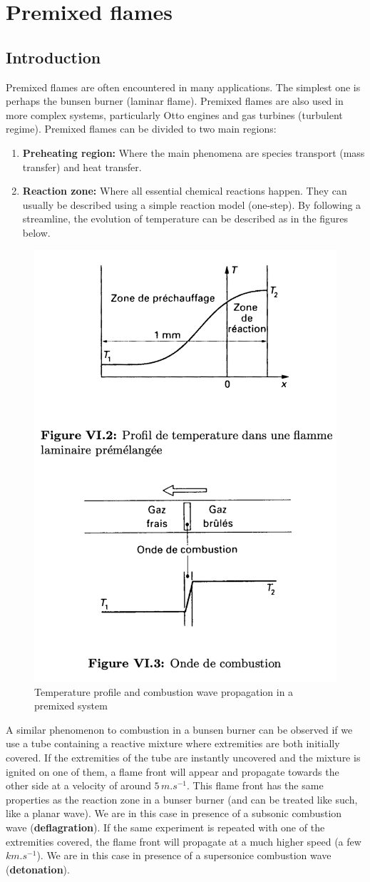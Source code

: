 \documentclass[a4paper,11pt]{article}
\begin{document}
\section{Premixed flames}
\subsection{Introduction}
Premixed flames are often encountered in many applications. The simplest one is perhaps the bunsen burner (laminar flame). Premixed flames are also used in more complex systems, particularly Otto engines and gas turbines (turbulent regime). Premixed flames can be divided to two main regions:
\begin{enumerate}
	\item \textbf{Preheating region:} Where the main phenomena are species transport (mass transfer) and heat transfer.
	\item \textbf{Reaction zone:} Where all essential chemical reactions happen. They can usually be described using a simple reaction model (one-step). By following a streamline, the evolution of temperature can be described as in the figures below.
\end{enumerate}
\begin{figure}[h]
	\centering
	\includegraphics[width=.49\linewidth]{figures/prmx.png}
	\caption{Temperature profile and combustion wave propagation in a premixed system}
\end{figure}
A similar phenomenon to combustion in a bunsen burner can be observed if we use a tube containing a reactive mixture where extremities are both initially covered. If the extremities of the tube are instantly uncovered and the mixture is ignited on one of them, a flame front will appear and propagate towards the other side at a velocity of around $5\,m.s^{-1}$. This flame front has the same properties as the reaction zone in a bunser burner (and can be treated like such, like a planar wave). We are in this case in presence of a subsonic combustion wave (\textbf{deflagration}). If the same experiment is repeated with one of the extremities covered, the flame front will propagate at a much higher speed (a few $km.s^{-1}$). We are in this case in presence of a supersonice combustion wave (\textbf{detonation}).
\end{document}
